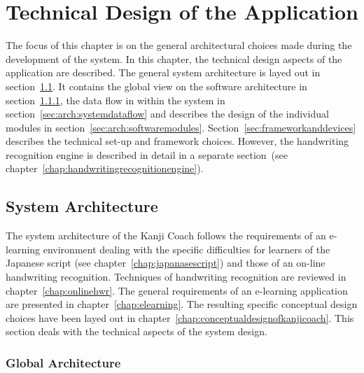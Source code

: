 
\chapter{Technical Design of the Application}
\label{chap:technicaldesign}

The focus of this chapter is on the general architectural choices made during
the development of the system. In this chapter, the technical design aspects 
of the application are described. The general system architecture is layed out in
section~\ref{sec:systemarchitecture}. It contains the global view on the software
architecture in section~\ref{sec:globalarchitecture}, the data flow in within
the system in section~\ref{sec:arch:systemdataflow} and describes the design
of the individual modules in section~\ref{sec:arch:softwaremodules}.
Section~\ref{sec:frameworkanddevices} describes the technical set-up and 
framework choices. However, the handwriting recognition engine is described 
in detail in a separate 
section~(see chapter~\ref{chap:handwritingrecognitionengine}).

\section{System Architecture}
\label{sec:systemarchitecture}

The system architecture of the Kanji Coach follows the requirements of an 
e-learning environment dealing with the specific difficulties for learners 
of the Japanese script (see chapter~\ref{chap:japanasescript}) and those of an 
on-line handwriting recognition. Techniques of handwriting recognition are 
reviewed in chapter~\ref{chap:onlinehwr}. The general requirements of an 
e-learning application are presented in chapter~\ref{chap:elearning}. 
The resulting specific conceptual design choices have been 
layed out in chapter~\ref{chap:conceptualdesignofkanjicoach}. This
section deals with the technical aspects of the system design.

\subsection{Global Architecture}
\label{sec:globalarchitecture}

